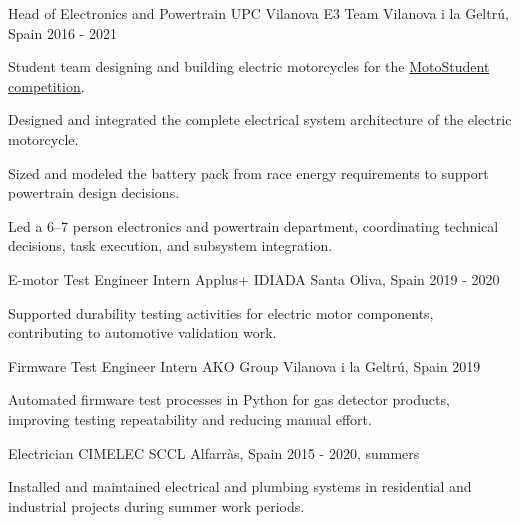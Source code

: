\begin{cventries}
  \cventry
    {Head of Electronics and Powertrain}
    {UPC Vilanova E3 Team}
    {Vilanova i la Geltr\'u, Spain}
    {2016 - 2021}
    {
      \begin{cvitems}
        \item {Student team designing and building electric motorcycles for the \href{https://www.motostudent.com/}{MotoStudent competition}.}
        \item {Designed and integrated the complete electrical system architecture of the electric motorcycle.}
        \item {Sized and modeled the battery pack from race energy requirements to support powertrain design decisions.}
        \item {Led a 6--7 person electronics and powertrain department, coordinating technical decisions, task execution, and subsystem integration.}
      \end{cvitems}
    }

  \cventry
    {E-motor Test Engineer Intern}
    {Applus+ IDIADA}
    {Santa Oliva, Spain}
    {2019 - 2020}
    {
      \begin{cvitems}
        \item {Supported durability testing activities for electric motor components, contributing to automotive validation work.}
      \end{cvitems}
    }

  \cventry
    {Firmware Test Engineer Intern}
    {AKO Group}
    {Vilanova i la Geltr\'u, Spain}
    {2019}
    {
      \begin{cvitems}
        \item {Automated firmware test processes in Python for gas detector products, improving testing repeatability and reducing manual effort.}
      \end{cvitems}
    }

  \cventry
    {Electrician}
    {CIMELEC SCCL}
    {Alfarr\`as, Spain}
    {2015 - 2020, summers}
    {
      \begin{cvitems}
        \item {Installed and maintained electrical and plumbing systems in residential and industrial projects during summer work periods.}
      \end{cvitems}
    }

\end{cventries}

